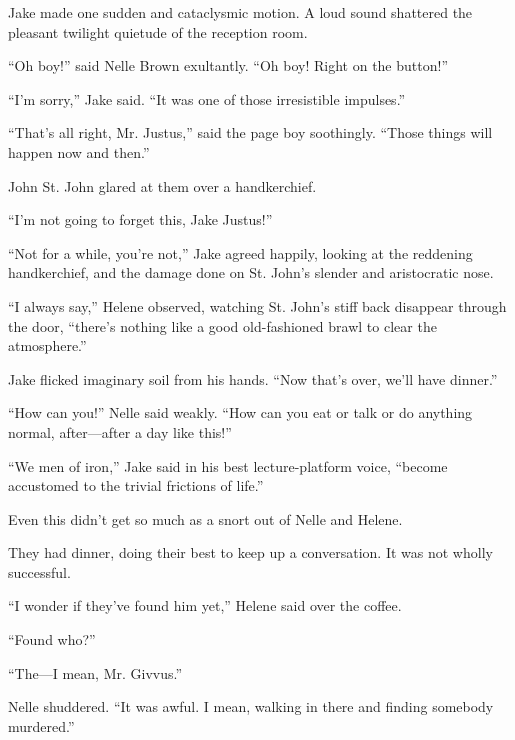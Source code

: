 \documentclass{novel}
\begin{document}
Jake made one sudden and cataclysmic motion. A loud sound shattered the pleasant twilight quietude of the reception room.

“Oh boy!” said Nelle Brown exultantly. “Oh boy! Right on the button!”

\vspace{2\nbs}
\clearpage
\thispagestyle{empty}

\begin{ChapterStart}
\vspace{3\nbs}
\end{ChapterStart}

“I'm sorry,” Jake said. “It was one of those irresistible impulses.”

“That’s all right, Mr. Justus,” said the page boy soothingly. “Those things will happen now and then.”

John St. John glared at them over a handkerchief.

“I'm not going to forget this, Jake Justus!”

“Not for a while, you’re not,” Jake agreed happily, looking at the reddening handkerchief, and the damage done on St. John’s slender and aristocratic nose.

“I always say,” Helene observed, watching St. John’s stiff back disappear through the door, “there’s nothing like a good old-fashioned brawl to clear the atmosphere.”

Jake flicked imaginary soil from his hands. “Now that’s over, we’ll have dinner.”

“How can you!” Nelle said weakly. “How can you eat or talk or do anything normal, after—after a day like this!”

“We men of iron,” Jake said in his best lecture-platform voice, “become accustomed to the trivial frictions of life.”

Even this didn’t get so much as a snort out of Nelle and Helene.

They had dinner, doing their best to keep up a conversation. It was not wholly successful.

“I wonder if they’ve found him yet,” Helene said over the coffee.

“Found who?”

“The—I mean, Mr. Givvus.”

Nelle shuddered. “It was awful. I mean, walking in there and finding somebody murdered.”
\end{document}
